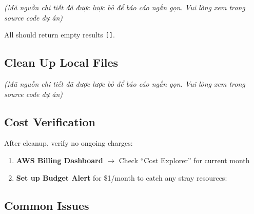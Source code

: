\emph{(Mã nguồn chi tiết đã được lược bỏ để báo cáo ngắn gọn. Vui lòng
xem trong source code dự án)}

All should return empty results \texttt{{[}{]}}.

\hypertarget{clean-up-local-files}{%
\subsection{Clean Up Local Files}}

\emph{(Mã nguồn chi tiết đã được lược bỏ để báo cáo ngắn gọn. Vui lòng
xem trong source code dự án)}

\hypertarget{cost-verification}{%
\subsection{Cost Verification}}

After cleanup, verify no ongoing charges:

\begin{enumerate}
\def\labelenumi{\arabic{enumi}.}
\item
  \textbf{AWS Billing Dashboard} \(\rightarrow\) Check ``Cost Explorer''
  for current month
\item
  \textbf{Set up Budget Alert} for \$1/month to catch any stray
  resources:

\begin{Shaded}
\begin{Highlighting}[]
 \VariableTok{$(}\VariableTok{)} 
\end{Highlighting}
\end{Shaded}
\end{enumerate}

\hypertarget{common-issues}{%
\subsection{Common Issues}}

